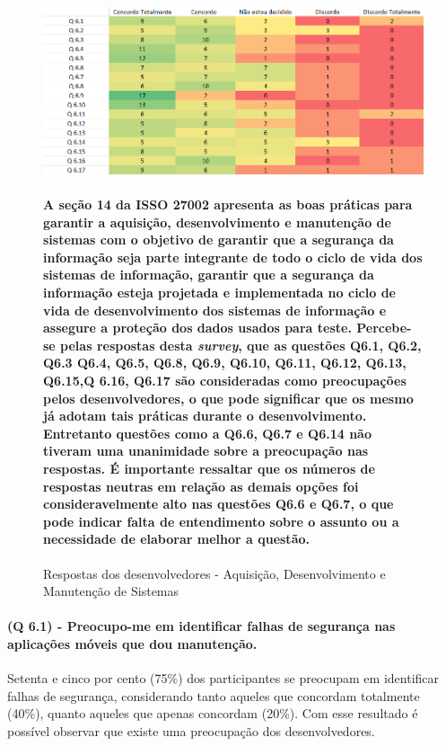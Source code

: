 \begin{figure}[H]
\includegraphics[scale=0.7]{fig/Mapa de calor 4.PNG}
\caption{Respostas dos desenvolvedores - Aquisição, Desenvolvimento e Manutenção de Sistemas}
\label{fig:4}
\paragraph{A seção 14 da ISSO 27002 apresenta as boas práticas para  garantir a aquisição, desenvolvimento e manutenção de sistemas com o objetivo de garantir que a segurança da informação seja parte integrante de todo o ciclo de vida dos sistemas de informação, garantir que a segurança da informação esteja projetada e implementada no ciclo de vida de desenvolvimento dos sistemas de informação e assegure a proteção dos dados usados para teste. Percebe-se pelas respostas desta \textit{survey}, que as questões Q6.1, Q6.2, Q6.3 Q6.4, Q6.5, Q6.8, Q6.9, Q6.10, Q6.11, Q6.12, Q6.13, Q6.15,Q 6.16, Q6.17 são consideradas como preocupações pelos desenvolvedores, o que pode significar que os mesmo já adotam tais práticas durante o desenvolvimento. Entretanto questões como a Q6.6, Q6.7 e Q6.14 não tiveram uma unanimidade sobre a preocupação nas respostas. É importante ressaltar que os números de respostas neutras em relação as demais opções foi consideravelmente alto nas questões Q6.6 e Q6.7, o que pode indicar falta de entendimento sobre o assunto ou a necessidade de elaborar melhor a questão.}
\end{figure}

\paragraph{\textbf{(Q 6.1)} - Preocupo-me em identificar falhas de segurança nas aplicações móveis que dou manutenção.}

Setenta e cinco por cento (75{\%}) dos participantes se preocupam em identificar falhas de segurança, considerando tanto aqueles que concordam totalmente (40{\%}), quanto aqueles que apenas concordam (20{\%}). Com esse resultado é possível observar que existe uma preocupação dos desenvolvedores.

